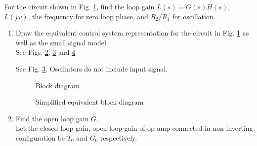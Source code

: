 For the circuit shown in Fig. \ref{fig:ee18btech11047_fig1}, find the loop gain $L(s) = G(s)H(s)$, $L(j\omega)$, the frequency for zero loop phase, and $R_{2}/R_{1}$ for oscillation.
\begin{enumerate}[label=\arabic*.,ref=\theenumi]

\item Draw the equivalent control system representation for the circuit in Fig. \ref{fig:ee18btech11047_fig1} as well as the small signal model.
\\
\solution See Figs. \ref{fig:ee18btech11047_block}, \ref{fig:ee18btech11047_fig2} and \ref{fig:ee18btech11047_fig3}
%
\renewcommand{\thefigure}{\theenumi.\arabic{figure}}
%
\begin{figure}[!ht]
	\begin{center}
		\resizebox{\columnwidth}{!}{}
	\end{center}
\caption{}
\label{fig:ee18btech11047_fig1}
\end{figure}
%
\solution See Fig. \ref{fig:ee18btech11047_fig2}. Oscillators do not include input signal.
\begin{figure}[!ht]
	\begin{center}
		\resizebox{\columnwidth}{!}{}
	\end{center}
\caption{Block diagram}
\label{fig:ee18btech11047_block}
\end{figure}
\begin{figure}[!ht]
	\begin{center}
		\resizebox{\columnwidth}{!}{}
	\end{center}
\caption{Simplified equivalent block diagram}
\label{fig:ee18btech11047_fig2}
\end{figure}
%
\begin{figure}[!ht]
	\begin{center}
		\resizebox{\columnwidth}{!}{}
	\end{center}
\caption{}
\label{fig:ee18btech11047_fig3}
\end{figure}
\renewcommand{\thefigure}{\theenumi}
%
\item Find the open loop gain $G$.\\
\label{prob:ee18btech11047_G}
\solution Let the closed loop gain, open-loop gain of op-amp connected in non-inverting configuration be $T_{0}$ and $G_{0}$ respectively.

\end{enumerate}
